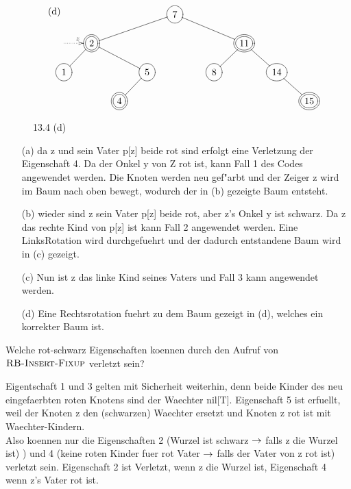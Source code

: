 \documentclass[a4paper,twoside,DIV15,BCOR12mm]{scrbook}
\begin{document}
\begin{figure}[htb]
	\centering
	$\begin{xy}
		\entrymodifiers={}
		
		\xymatrixcolsep{1pc}
		\xymatrixrowsep{1pc}
		\text{(d)}
		\xymatrix {
& & & &*++[o][F-]{7}\ar@{-}[rrrd]\ar@{-}[llld]\\
 \ar@{.>}[r]^{z}&*++[o][F=]{2} \ar@{-}[rrd]\ar@{-}[ld]& & & & & & *++[o][F=]{11} \ar@{-}[rd]\ar@{-}[ld]& \\
*++[o][F-]{1}& & & *++[o][F-]{5}\ar@{-}[ld]  && &*++[o][F-]{8}&  & *++[o][F-]{14}\ar@{-}[rd] \\
& &*++[o][F=]{4} & & & & && & *++[o][F=]{15} \\
		}
	\end{xy}$
		\caption{13.4 (d)}
	\label{Abbildung 13.4 (d)}

\end{figure}


\begin{itemize}
\item[(a)] da z und sein Vater p[z] beide rot sind erfolgt eine Verletzung der Eigenschaft 4. Da der Onkel y von Z rot ist, kann Fall 1 des Codes angewendet werden. Die Knoten werden neu gef"arbt und der Zeiger z wird im Baum nach oben bewegt, wodurch der in (b) gezeigte Baum entsteht.
\item[(b)] wieder sind z sein Vater p[z] beide rot, aber z's Onkel y ist schwarz. Da z das rechte Kind von p[z] ist kann Fall 2 angewendet werden.
Eine LinksRotation wird durchgefuehrt und der dadurch entstandene Baum wird in (c) gezeigt.
\item[(c)] Nun ist z das linke Kind seines Vaters und Fall 3 kann angewendet werden. 
\item[(d)] Eine Rechtsrotation fuehrt zu dem Baum gezeigt in (d), welches ein korrekter Baum ist.
\end{itemize}
Welche rot-schwarz Eigenschaften koennen durch den Aufruf von $\textnormal{\scshape RB-Insert-Fixup}$ verletzt sein?

Eigentschaft 1 und 3 gelten mit Sicherheit weiterhin, denn beide Kinder des neu eingefaerbten roten Knotens sind der Waechter nil[T].
Eigenschaft 5 ist erfuellt, weil der Knoten z den (schwarzen) Waechter ersetzt und Knoten z rot ist mit Waechter-Kindern. \\
Also koennen nur die Eigenschaften 2 (Wurzel ist schwarz $\rightarrow$ falls z die Wurzel ist) ) und 4 (keine roten Kinder fuer rot Vater $\rightarrow$ falls der Vater von z rot ist) verletzt sein.
Eigenschaft 2 ist Verletzt, wenn z die Wurzel ist, Eigenschaft 4 wenn z's Vater rot ist.\\
\end{document}
